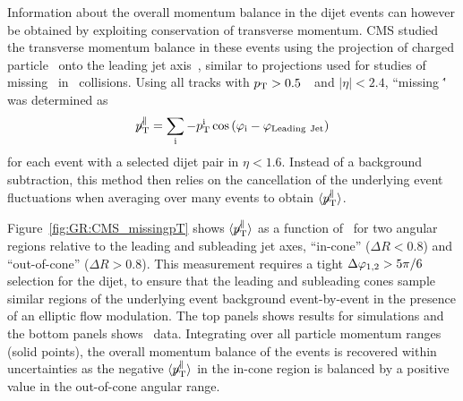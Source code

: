 Information about the overall momentum balance in the dijet events can however be obtained by exploiting
conservation of transverse momentum. CMS studied the transverse momentum balance in these events
using the projection of charged particle \pT\ onto the leading 
jet axis~\cite{Chatrchyan:2011sx}, similar to projections used for studies of missing \pT\ in \pp\
collisions.  Using all tracks with $\mbox{$p_{\mathrm{T}}$} > 0.5$~\GeVc\ and $|\eta| < 2.4$, 
``missing \pT\'' was determined as 
\begin{equation}
\displaystyle{\not} p_{\mathrm{T}}^{\parallel} =
\sum_{\rm i}{ -p_{\mathrm{T}}^{\rm i}\cos{(\varphi_{\rm i}-\varphi_{\rm Leading\ Jet})}}
\end{equation}
for each event with a selected dijet pair in $\eta < 1.6$.
Instead of a background subtraction, this method then relies on the cancellation of the
underlying event fluctuations when averaging over many events to obtain
$\langle \displaystyle{\not} p_{\mathrm{T}}^{\parallel} \rangle$.

Figure~\ref{fig:GR:CMS_missingpT} shows $\langle \displaystyle{\not} p_{\mathrm{T}}^{\parallel} \rangle$
as a function of \AJ\ for two angular regions relative to the leading and subleading
jet axes, ``in-cone'' ($\Delta R < 0.8$) and ``out-of-cone'' ($\Delta R > 0.8$).
This measurement requires a tight $\Delta\varphi_{1,2} > 5 \pi/6$ selection for the dijet, to ensure that the 
leading and subleading cones sample similar regions of the underlying event background 
event-by-event in the presence of an elliptic flow modulation.
The top panels shows results for  {} simulations and the bottom panels shows
\PbPb\ data. Integrating over all particle momentum ranges (solid points),
 the overall momentum balance of the events is recovered within uncertainties
as the negative $\langle \displaystyle{\not} p_{\mathrm{T}}^{\parallel} \rangle$ in
the in-cone region is balanced by a positive value in the out-of-cone angular range.

